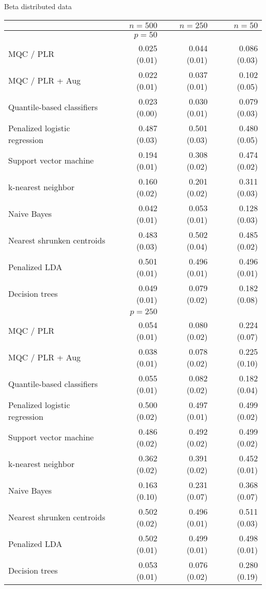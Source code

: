 \begin{table}[p]
  \centering
  Beta distributed data \\ [2ex]
  \begin{adjustbox}{max size={\textwidth}{10cm}}
    \begin{tabular}{l@{\extracolsep{15mm}}rrr}
      
      \hline
      & $n=500$ & $n=250$ & $n=50$ \\ 
      \hline
      & $p = 50$ \\
      \hline

      MQC / PLR & 0.025 (0.01) & 0.044 (0.01) & 0.086 (0.03) \\ 
      MQC / PLR + Aug & 0.022 (0.01) & 0.037 (0.01) & 0.102 (0.05) \\ 
      Quantile-based classifiers & 0.023 (0.00) & 0.030 (0.01) & 0.079 (0.03) \\ 
      Penalized logistic regression & 0.487 (0.03) & 0.501 (0.03) & 0.480 (0.05) \\ 
      Support vector machine & 0.194 (0.01) & 0.308 (0.02) & 0.474 (0.02) \\ 
      k-nearest neighbor & 0.160 (0.02) & 0.201 (0.02) & 0.311 (0.03) \\ 
      Naive Bayes & 0.042 (0.01) & 0.053 (0.01) & 0.128 (0.03) \\ 
      Nearest shrunken centroids & 0.483 (0.03) & 0.502 (0.04) & 0.485 (0.02) \\ 
      Penalized LDA & 0.501 (0.01) & 0.496 (0.01) & 0.496 (0.01) \\ 
      Decision trees & 0.049 (0.01) & 0.079 (0.02) & 0.182 (0.08) \\ [2ex]

      \hline
      & $p = 250$ \\
      \hline

      MQC / PLR & 0.054 (0.01) & 0.080 (0.02) & 0.224 (0.07) \\ 
      MQC / PLR + Aug & 0.038 (0.01) & 0.078 (0.02) & 0.225 (0.10) \\ 
      Quantile-based classifiers & 0.055 (0.01) & 0.082 (0.02) & 0.182 (0.04) \\ 
      Penalized logistic regression & 0.500 (0.02) & 0.497 (0.01) & 0.499 (0.02) \\ 
      Support vector machine & 0.486 (0.02) & 0.492 (0.02) & 0.499 (0.02) \\ 
      k-nearest neighbor & 0.362 (0.02) & 0.391 (0.02) & 0.452 (0.01) \\ 
      Naive Bayes & 0.163 (0.10) & 0.231 (0.07) & 0.368 (0.07) \\ 
      Nearest shrunken centroids & 0.502 (0.02) & 0.496 (0.01) & 0.511 (0.03) \\ 
      Penalized LDA & 0.502 (0.01) & 0.499 (0.01) & 0.498 (0.01) \\ 
      Decision trees & 0.053 (0.01) & 0.076 (0.02) & 0.280 (0.19) \\ [2ex]


\end{tabular}
\end{adjustbox}
\end{table}
